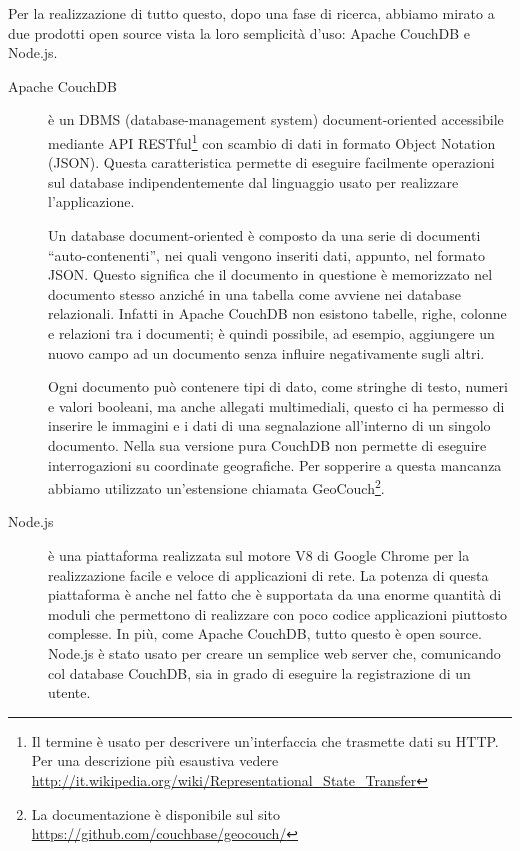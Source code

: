 		Per la realizzazione di tutto questo, dopo una fase di ricerca, abbiamo
		mirato a due prodotti open source vista la loro semplicità d'uso:
		Apache CouchDB\texttrademark{} e Node.js.
		\begin{description}
			\item[Apache CouchDB\texttrademark{}] è un DBMS (database-management
				system) document-o\-rien\-ted accessibile mediante API RESTful\footnote{Il termine è usato
				per descrivere un'interfaccia che trasmette dati su HTTP. Per una
				descrizione più esaustiva vedere
				\url{http://it.wikipedia.org/wiki/Representational_State_Transfer}}
				con scambio di dati in formato \js{} Object Notation (JSON). Questa
				caratteristica permette di eseguire facilmente operazioni sul database
				indipendentemente dal linguaggio usato per realizzare l'applicazione.
				
				Un database document-oriented è composto da una serie di documenti
				``auto-contenenti'', nei quali vengono inseriti dati, appunto, nel formato 
				JSON. Questo significa che il documento in
				questione è memorizzato nel documento stesso anziché in una tabella
				come avviene nei database relazionali. Infatti in Apache CouchDB\texttrademark{}
				non esistono tabelle, righe, colonne e relazioni tra i
				documenti; è quindi possibile, ad esempio, aggiungere un nuovo
				campo ad un documento senza influire negativamente sugli altri.
				
				Ogni documento può contenere tipi di dato, come stringhe 
				di testo, numeri e valori booleani, ma anche allegati multimediali, 
				questo ci ha permesso di inserire le immagini e i dati di una 
				segnalazione all'interno di un singolo documento.
				Nella sua versione pura CouchDB non permette di eseguire interrogazioni 
				su coordinate geografiche. Per sopperire a questa mancanza abbiamo 
				utilizzato un'estensione chiamata GeoCouch\footnote{La documentazione 
				è disponibile sul sito \url{https://github.com/couchbase/geocouch/}}.
			\item[Node.js] è una piattaforma realizzata sul motore \js{} V8 di
				Google Chrome per la realizzazione facile e veloce di
				applicazioni di rete. La potenza di questa piattaforma è anche
				nel fatto che è supportata da una enorme quantità di moduli
				che permettono di realizzare con poco codice applicazioni piuttosto
				complesse. In più, come Apache CouchDB\texttrademark{}, tutto 
				questo è open source.
				Node.js è stato usato per creare un semplice web server 
				che, comunicando col database CouchDB, sia in grado di eseguire la 
				registrazione di un utente.
		\end{description}
		
